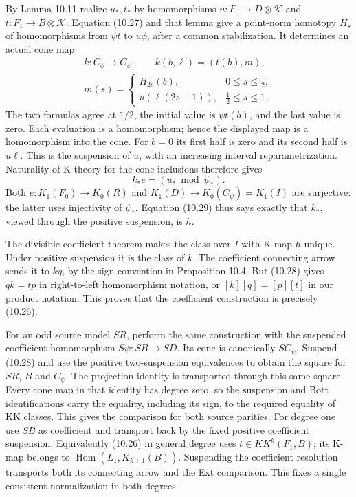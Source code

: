 \documentclass[
  11pt,
]{article}
\begin{document}
By Lemma 10.11 realize \(u_*,t_*\) by homomorphisms
\(u:F_0\to D\otimes\mathcal K\) and \(t:F_1\to B\otimes\mathcal K\).
Equation (10.27) and that lemma give a point-norm homotopy \(H_s\) of
homomorphisms from \(\psi t\) to \(u\phi\), after a common
stabilization. It determines an actual cone map \[
\begin{gathered}
k:C_\phi\longrightarrow C_\psi,\qquad
k(b,\ell)=(t(b),m),\\
m(s)=
\begin{cases}
H_{2s}(b),&0\leq s\leq\tfrac12,\\
u(\ell(2s-1)),&\tfrac12\leq s\leq1.
\end{cases}
\end{gathered}
\tag{10.28}
\] The two formulas agree at \(1/2\), the initial value is
\(\psi t(b)\), and the last value is zero. Each evaluation is a
homomorphism; hence the displayed map is a homomorphism into the cone.
For \(b=0\) its first half is zero and its second half is \(u\ell\).
This is the suspension of \(u\), with an increasing interval
reparametrization. Naturality of K-theory for the cone inclusions
therefore gives \[
k_*e=(u_*\bmod\psi_*).
\tag{10.29}
\] Both \(e:K_1(F_0)\to K_0(R)\) and \(K_1(D)\to K_0(C_\psi)=K_1(I)\)
are surjective: the latter uses injectivity of \(\psi_*\). Equation
(10.29) thus says exactly that \(k_*\), viewed through the positive
suspension, is \(h\).

The divisible-coefficient theorem makes the class over \(I\) with K-map
\(h\) unique. Under positive suspension it is the class of \(k\). The
coefficient connecting arrow sends it to \(kq\), by the sign convention
in Proposition 10.4. But (10.28) gives \(qk=tp\) in right-to-left
homomorphism notation, or \([k][q]=[p][t]\) in our product notation.
This proves that the coefficient construction is precisely (10.26).

For an odd source model \(SR\), perform the same construction with the
suspended coefficient homomorphism \(S\psi:SB\to SD\). Its cone is
canonically \(SC_\psi\). Suspend (10.28) and use the positive
two-suspension equivalences to obtain the square for \(SR\), \(B\) and
\(C_\psi\). The projection identity is transported through this same
square. Every cone map in that identity has degree zero, so the
suspension and Bott identifications carry the equality, including its
sign, to the required equality of KK classes. This gives the comparison
for both source parities. For degree one use \(SB\) as coefficient and
transport back by the fixed positive coefficient suspension.
Equivalently (10.26) in general degree uses \(t\in KK^k(F_1,B)\); its
K-map belongs to \(\operatorname{Hom}(L_1,K_{k+1}(B))\). Suspending the
coefficient resolution transports both its connecting arrow and the Ext
comparison. This fixes a single consistent normalization in both
degrees.
\end{document}
